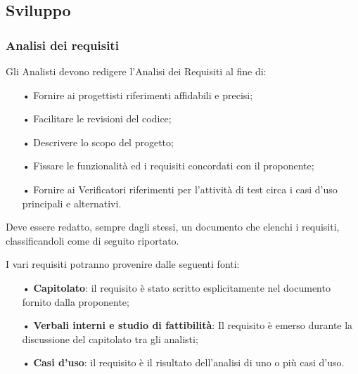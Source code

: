 \subsection{Sviluppo}
\subsubsection{Analisi dei requisiti}
Gli Analisti devono redigere l'Analisi dei Requisiti al fine di:
\begin{itemize}
    \item[•] Fornire ai progettisti riferimenti affidabili e precisi;
    \item[•] Facilitare le revisioni del codice;
    \item[•] Descrivere lo scopo del progetto;
    \item[•] Fissare le funzionalità ed i requisiti concordati con il proponente;
    \item[•] Fornire ai Verificatori riferimenti per l'attività di test circa i casi d'uso principali e alternativi.
\end{itemize}

Deve essere redatto, sempre dagli stessi, un documento che elenchi i requisiti, classificandoli come di seguito riportato.

I vari requisiti potranno provenire dalle seguenti fonti:
\begin{itemize}
    \item[•] \textbf{Capitolato}: il requisito è stato scritto esplicitamente nel documento fornito dalla proponente;
    \item[•] \textbf{Verbali interni e studio di fattibilità}: Il requisito è emerso durante la discussione del capitolato tra gli analisti;
    \item[•] \textbf{Casi d'uso}: il requisito è il risultato dell'analisi di uno o più casi d'uso.
\end{itemize}

